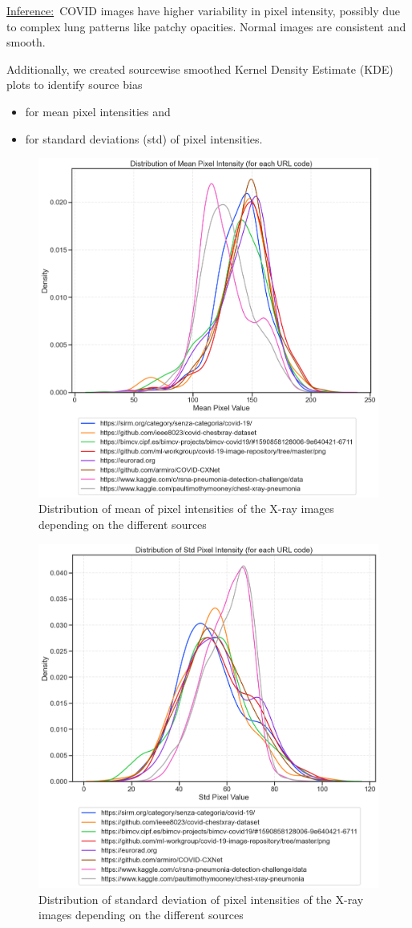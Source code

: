 \documentclass{article}
\begin{document}
\underline{Inference:}\
COVID images have higher variability in pixel intensity, possibly due to complex lung patterns like patchy opacities. Normal images are consistent and smooth.

\vspace{0.5cm}

Additionally, we created sourcewise smoothed Kernel Density Estimate (KDE) plots to identify source bias\\
\begin{itemize}
\item for mean pixel intensities and
\item for standard deviations (std) of pixel intensities.
\end{itemize}


\begin{figure}[h!] %
    \centering
    \includegraphics[width=0.5\linewidth]{mean_pixel_sources.png}
    \caption{Distribution of mean of pixel intensities of the X-ray images depending on the different sources}
    \label{fig:distr_mean_pixel_source}
\end{figure}
\begin{figure}[h!] %
    \centering
    \includegraphics[width=0.5\linewidth]{std_pixel_sources.png}
    \caption{Distribution of standard deviation of pixel intensities of the X-ray images depending on the different sources}
    \label{fig:distr_std_pixel_source}
\end{figure}
\end{document}
